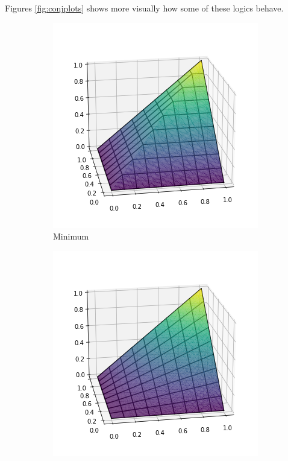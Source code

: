 Figures \ref{fig:conjplots} shows more visually how some of these logics behave.

\begin{figure}[h]
    \centering
    \begin{subfigure}[b]{0.2\textwidth}
        \centering
        \includegraphics[width=\textwidth]{imgs/fuzzy_min_and.png}
        \caption{Minimum}
        \label{fig:minconj}
    \end{subfigure}
    \begin{subfigure}[b]{0.2\textwidth}
        \centering
        \includegraphics[width=\textwidth]{imgs/fuzzy_prod_and.png}

\end{subfigure}
\end{figure}
